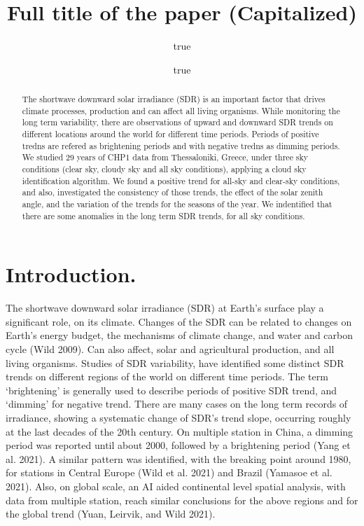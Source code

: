 \documentclass[
]{article}
\title{Full title of the paper (Capitalized)}
\author{true \and true}
\date{}
\begin{document}
\maketitle
\begin{abstract}
The shortwave downward solar irradiance (SDR) is an important factor that drives climate processes, production and can affect all living organisms.
While monitoring the long term variability, there are observations of upward and downward SDR trends on different locations around the world for different time periods.
Periods of positive tredns are refered as brightening periods and with negative tredns as dimming periods.
We studied 29 years of CHP1 data from Thessaloniki, Greece, under three sky conditions (clear sky, cloudy sky and all sky conditions), applying a cloud sky identification algorithm.
We found a positive trend for all-sky and clear-sky conditions, and also, investigated the consistency of those trends, the effect of the solar zenith angle, and the variation of the trends for the seasons of the year.
We indentified that there are some anomalies in the long term SDR trends, for all sky conditions.
\end{abstract}

{
\setcounter{tocdepth}{2}
\tableofcontents
}
\hypertarget{introduction.}{%
\section{Introduction.}\label{introduction.}}

The shortwave downward solar irradiance (SDR) at Earth's surface play a significant role, on its climate.
Changes of the SDR can be related to changes on Earth's energy budget, the mechanisms of climate change, and water and carbon cycle (Wild 2009).
Can also affect, solar and agricultural production, and all living organisms.
Studies of SDR variability, have identified some distinct SDR trends on different regions of the world on different time periods.
The term `brightening' is generally used to describe periods of positive SDR trend, and `dimming' for negative trend.
There are many cases on the long term records of irradiance, showing a systematic change of SDR's trend slope, occurring roughly at the last decades of the 20th century.
On multiple station in China, a dimming period was reported until about 2000, followed by a brightening period (Yang et al. 2021).
A similar pattern was identified, with the breaking point around 1980, for stations in Central Europe (Wild et al. 2021) and Brazil (Yamasoe et al. 2021).
Also, on global scale, an AI aided continental level spatial analysis, with data from multiple station, reach similar conclusions for the above regions and for the global trend (Yuan, Leirvik, and Wild 2021).
\end{document}
